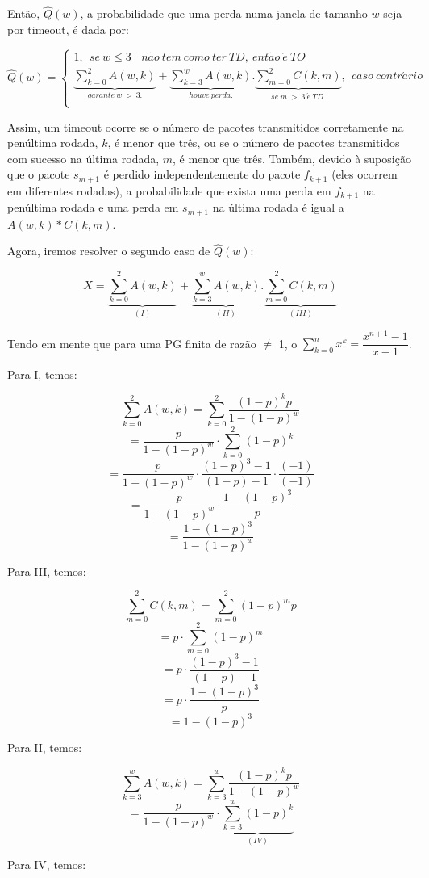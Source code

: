 Então, $\hat{Q}(w)$, a probabilidade que uma perda numa janela de tamanho $w$ seja por timeout, é dada por:

$$\hat{Q}(w) = \begin{cases} 
  1,  \ \ se \ w \leq 3 \ \ \ \ n\tilde{a}o \ tem \ como \ ter \ TD, \ ent\tilde{a}o \ \acute{e} \ TO\\
  \underbrace{\sum_{k=0}^2A(w,k)}_{garante \ w \ > \ 3.} + \underbrace{\sum_{k=3}^wA(w,k)}_{houve \ perda.}.\underbrace{\sum_{m=0}^2C(k,m)}_{se \ m \ > \ 3 \ \acute{e} \ TD.},  \ \  caso \ contr\acute{a}rio \ \ \ \ \\
\end{cases}
 $$

Assim, um timeout ocorre se o número de pacotes transmitidos corretamente na penúltima rodada, $k$, é menor que três, ou se o número de pacotes transmitidos com sucesso na última rodada, $m$, é menor que três. Também, devido à suposição que o pacote $s_{m+1}$ é perdido independentemente do pacote $f_{k+1}$ (eles ocorrem em diferentes rodadas), a probabilidade que exista uma perda em $f_{k+1}$ na penúltima rodada e uma perda em $s_{m+1}$ na última rodada é igual a $A(w,k)*C(k,m)$.

Agora, iremos resolver o segundo caso de $\hat{Q}(w)$:

$$ X = \underbrace{\sum_{k=0}^2A(w,k)}_{(I)} + \underbrace{\sum_{k=3}^wA(w,k)}_{(II)}.\underbrace{\sum_{m=0}^2C(k,m)}_{(III)}$$

Tendo em mente que para uma PG finita de razão $\neq$ 1, o $\sum_{k=0}^nx^k = \dfrac{x^{n+1}-1}{x-1}$.

Para I, temos:

$$\sum_{k=0}^2A(w,k) =  \sum_{k=0}^2\frac{(1-p)^kp}{1-(1-p)^w}$$
$$ = \frac{p}{1-(1-p)^w} \cdot\sum_{k=0}^2(1-p)^k$$
$$ = \frac{p}{1-(1-p)^w}\cdot \frac{(1-p)^3 -1}{(1-p) - 1}\cdot\frac{(-1)}{(-1)}$$
$$ = \frac{p}{1-(1-p)^w} \cdot \frac{1 - (1-p)^3}{p}$$
$$ = \frac{1 - (1-p)^3}{1-(1-p)^w}$$

Para III, temos:

$$\sum_{m=0}^{2}C(k,m) = \sum_{m=0}^{2}(1-p)^mp $$
$$ = p \cdot \sum_{m=0}^{2}(1-p)^m $$
$$ = p \cdot \frac{(1-p)^3 - 1}{(1-p) - 1} $$
$$ = p \cdot \frac{1- (1-p)^3}{p} $$
$$ = 1- (1-p)^3 $$

Para II, temos: 

$$\sum_{k=3}^{w}A(w,k) =  \sum_{k=3}^{w}\frac{(1-p)^kp}{1-(1-p)^w}$$
$$ = \frac{p}{1-(1-p)^w} \cdot \underbrace{\sum_{k=3}^{w}(1-p)^k}_{(IV)} $$

Para IV, temos:

